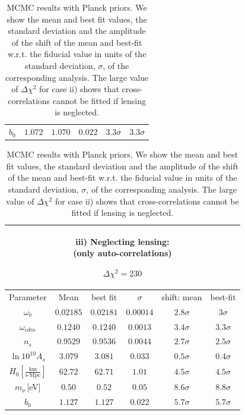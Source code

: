 \begin{table}[!t]
\begin{tabular}{@{}cccccc}
    $b_0$ & $1.072$ & $1.070$ & $0.022$ & $3.3\sigma$ & $3.3\sigma$\\
  \end{tabular}
  \begin{tabular}{@{}cccccc}
    \hline
    \multicolumn{6}{c}{\parbox[t]{4.4cm}{iii) Neglecting lensing: \\ \hspace*{0.9cm} (only auto-correlations)} $\Delta \chi^2 = 230$} \\
    \hline
    Parameter & Mean & best fit & $\sigma$ & \hspace{-0.52cm} shift: mean & best-fit\\
    \hline
    $\omega_b$ & $0.02185 $ & $0.02181 $ & $0.00014 $ &  \quad$2.8\sigma$ & $3\sigma$ \\
    $\omega_{cdm}$ & $0.1240 $ & $0.1240 $ & $0.0013 $ &  \quad$3.4\sigma$ & $3.3\sigma$ \\
    $n_s$      & $0.9529 $ & $0.9536 $ & $0.0044 $ &  \quad$2.7\sigma$ & $2.5\sigma$ \\
    $\ln10^{10}A_s$ & $3.079 $ & $3.081 $ & $0.033 $ &  \quad$0.5 \sigma$ & $0.4\sigma$ \\
    $H_0\left[\frac{\text{km}}{\text{s}\cdot\text{Mpc}}\right]$      & $62.72 $ & $62.71$ & $1.01$ &  \quad$4.5 \sigma$ & $4.5\sigma$ \\
    $m_{\nu}$\,[eV]  & $0.50$ & $0.52$ & $0.05$ &  \quad$8.6\sigma$ & $8.8\sigma$ \\
    $b_0$ & $1.127$ & $1.127$ & $0.022$ & $5.7\sigma$ & $5.7\sigma$ \\
  \end{tabular}
 \caption{MCMC results with Planck priors. We show the mean and best fit values, the standard deviation and the amplitude of the shift of the mean and best-fit w.r.t. the fiducial value in units of the standard deviation, $\sigma$, of the corresponding analysis. The large value of $\Delta \chi^2$ for case ii) shows that cross-correlations cannot be fitted if lensing is neglected.
  }
  \label{Table:2}
\end{table}


